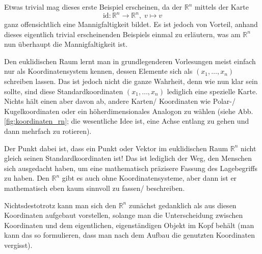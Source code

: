 \documentclass[../H_Analysis_main.tex]{subfiles}
\begin{document}
\begin{bsp}
Etwas trivial mag dieses erste Beispiel erscheinen, da der $\mathbb{R}^n$ mittels der Karte
\begin{equation}
\text{id}: \mathbb{R}^n \rightarrow \mathbb{R}^n, \; v \mapsto v
\end{equation}
ganz offensichtlich eine Mannigfaltigkeit bildet. Es ist jedoch von Vorteil, anhand dieses eigentlich trivial erscheinenden Beispiels einmal zu erläutern, was am $\mathbb{R}^n$ nun überhaupt die Mannigfaltigkeit ist.

Den euklidischen Raum lernt man in grundlegenderen Vorlesungen meist einfach nur als Koordinatensystem kennen, dessen Elemente sich als $(x_1, \dots, x_n)$ schreiben lassen. Das ist jedoch nicht die ganze Wahrheit, denn wie nun klar sein sollte, sind diese Standardkoordinaten $(x_1, \dots, x_n)$ lediglich eine spezielle Karte. Nichts hält einen aber davon ab, andere Karten/ Koordinaten wie Polar-/ Kugelkoordinaten oder ein höherdimensionales Analogon zu wählen (siehe Abb. \ref{fig:koordinaten_rn}; die wesentliche Idee ist, eine Achse entlang zu gehen und dann mehrfach zu rotieren).

Der Punkt dabei ist, dass ein Punkt oder Vektor im euklidischen Raum $\mathbb{R}^n$ nicht gleich seinen Standardkoordinaten ist! Das ist lediglich der Weg, den Menschen sich ausgedacht haben, um eine mathematisch präzisere Fassung des Lagebegriffs zu haben. Den $\mathbb{R}^n$ gibt es auch ohne Koordinatensysteme, aber dann ist er mathematisch eben kaum sinnvoll zu fassen/ beschreiben.

Nichtsdestotrotz kann man sich den $\mathbb{R}^n$ zunächst gedanklich als aus diesen Koordinaten aufgebaut vorstellen, solange man die Unterscheidung zwischen Koordinaten und dem eigentlichen, eigenständigen Objekt im Kopf behält (man kann das so formulieren, dass man nach dem Aufbau die genutzten Koordinaten vergisst).
\end{bsp}
\end{document}
